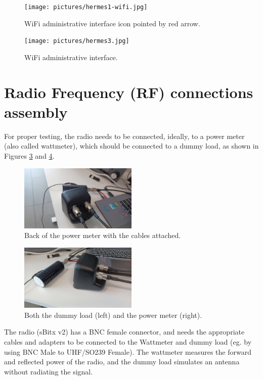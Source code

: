 \documentclass[11pt,a4paper]{article}
\begin{document}
\begin{figure}[H]
  \centering
  \texttt{[image: pictures/hermes1-wifi.jpg]}
  \caption{WiFi administrative interface icon pointed by red arrow.}
  \label{fig:hermes1wifi}
\end{figure}

\begin{figure}[H]
  \centering
  \texttt{[image: pictures/hermes3.jpg]}
  \caption{WiFi administrative interface.}
  \label{fig:hermes3}
\end{figure}

\section{Radio Frequency (RF) connections assembly}

For proper testing, the radio needs to be connected, ideally, to a power meter (also called wattmeter), which should be connected to a dummy load, as shown in Figures \ref{fig:backview1} and \ref{fig:backview3}.

\begin{figure}[H]
  \centering
  \includegraphics[width=0.5\textwidth]{pictures/wattmeter_1.jpeg}
  \caption{Back of the power meter with the cables attached.}
  \label{fig:backview1}
\end{figure}

\begin{figure}[H]
  \centering
  \includegraphics[width=0.5\textwidth]{pictures/wattmeter_3.jpeg}
  \caption{Both the dummy load (left) and the power meter (right).}
  \label{fig:backview3}
\end{figure}


The radio (sBitx v2) has a BNC female connector, and needs the appropriate cables and adapters to
be connected to the Wattmeter and dummy load (eg. by using BNC Male to UHF/SO239 Female). The wattmeter measures the forward and reflected power of the radio,
and the dummy load simulates an antenna without radiating the signal.
\end{document}
